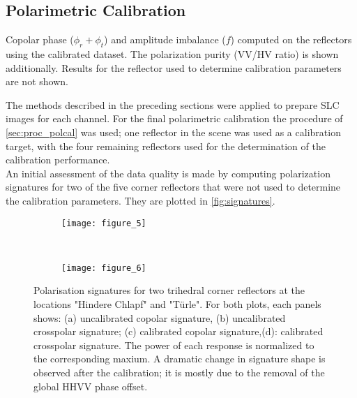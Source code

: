 \subsection{Polarimetric Calibration}\label{sec:res_polcal}

								
\begin{table}[h]
	\centering
	\caption{Copolar phase ($\phi_r + \phi_t$) and amplitude imbalance ($f$) computed on the reflectors using the calibrated dataset. The polarization purity (VV/HV ratio) is shown additionally. Results for the reflector used to determine calibration parameters are not shown.}
	\label{tab:polcal}
\end{table}		
The methods described in the preceding sections were applied to prepare SLC images for each channel. For the final polarimetric calibration the procedure of \autoref{sec:proc_polcal} was used; one reflector in the scene was used as a calibration target, with the four remaining reflectors used for the determination of the calibration performance.\\
An initial assessment of the data quality is made  by computing polarization signatures\cite{VanZyl1987} for two of the five corner reflectors that were not used to determine the calibration parameters. They are plotted in \autoref{fig:signatures}.
\begin{figure*}[hb]
	\centering
	\begin{subfigure}[t]{\textwidth}
	\centering
	\texttt{[image: figure\_5]}
	\label{fig:signatures:near}
	\end{subfigure}\\
	\begin{subfigure}[t]{\textwidth}
	\centering
	\texttt{[image: figure\_6]}
	\label{fig:signatures:far}
	\end{subfigure}
	\caption{Polarisation signatures for two trihedral corner reflectors at the locations "Hindere Chlapf" and "T\"{u}rle". For both plots, each panels shows: (a) uncalibrated copolar signature, (b) uncalibrated crosspolar signature; (c) calibrated copolar signature,(d): calibrated crosspolar signature. The power of each response is normalized to the corresponding maxium. A dramatic change in signature shape is observed after the calibration; it is mostly due to the removal of the global HHVV phase offset.}
	\label{fig:signatures}
\end{figure*}

